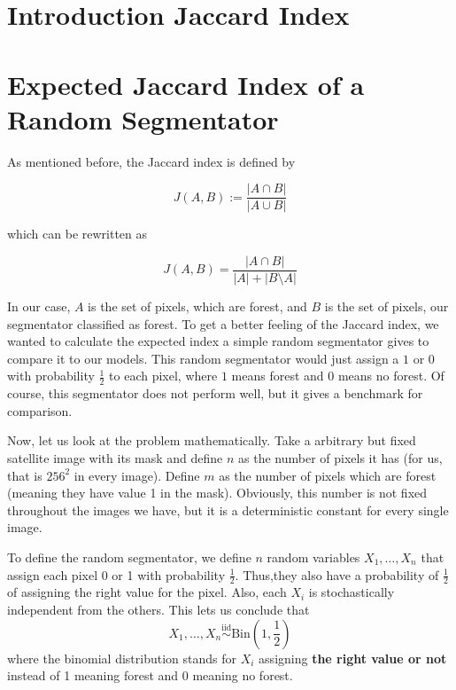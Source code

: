 \section{Introduction Jaccard Index}
\section{Expected Jaccard Index of a Random Segmentator}
As mentioned before, the Jaccard index is defined by

\begin{equation}
  J(A, B) := \frac{|A \cap B|}{|A \cup B|}
\end{equation}

which can be rewritten as

\begin{equation}
  J(A, B) = \frac{|A \cap B|}{|A| + |B \setminus A |}
\end{equation}

In our case, $A$ is the set of pixels, which are forest, and $B$ is the set of pixels, our segmentator classified as forest. To get a better feeling of the Jaccard index, we wanted to calculate the expected index a simple random segmentator gives to compare it to our models. This random segmentator would just assign a $1$ or $0$ with probability $\frac{1}{2}$ to each pixel, where $1$ means forest and $0$ means no forest. Of course, this segmentator does not perform well, but it gives a benchmark for comparison.

Now, let us look at the problem mathematically. Take a arbitrary but fixed satellite image with its mask and define $n$ as the number of pixels it has (for us, that is $256^2$ in every image). Define $m$ as the number of pixels which are forest (meaning they have value 1 in the mask). Obviously, this number is not fixed throughout the images we have, but it is a deterministic constant for every single image.

To define the random segmentator, we define $n$ random variables $X_1, \dots, X_n$ that assign each pixel 0 or 1 with probability $\frac{1}{2}$. Thus,they also have a probability of $\frac{1}{2}$ of assigning the right value for the pixel. Also, each $X_i$ is stochastically independent from the others. This lets us conclude that
\begin{equation}
  X_1, \dots, X_n \overset{\mathrm{iid}}{\sim} \text{Bin}(1, \frac{1}{2})
\end{equation}
where the binomial distribution stands for $X_i$ assigning \textbf{the right value or not} instead of 1 meaning forest and 0 meaning no forest.

